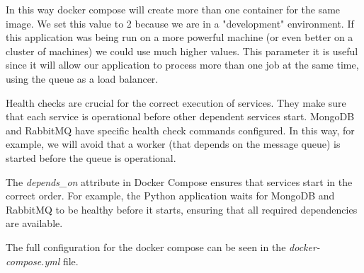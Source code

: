 In this way docker compose will create more than one container for the same
image. We set this value to 2 because we are in a "development" environment.
If this application was being run on a more powerful machine (or even better
on a cluster of machines) we could use much higher values.
This parameter it is useful since it will allow our application to process more
than one job at the same time, using the queue as a load balancer.

Health checks are crucial for the correct execution of services. They make sure
that each service is operational before other dependent services start. MongoDB and
RabbitMQ have specific health check commands configured.
In this way, for example, we will avoid that a worker (that depends on the message
queue) is started before the queue is operational.

The \textit{depends\_on} attribute in Docker Compose ensures that services start
in the correct order. For example, the Python application waits for MongoDB and
RabbitMQ to be healthy before it starts, ensuring that all required
dependencies are available.

The full configuration for the docker compose can be seen in the
\textit{docker-compose.yml} file.

